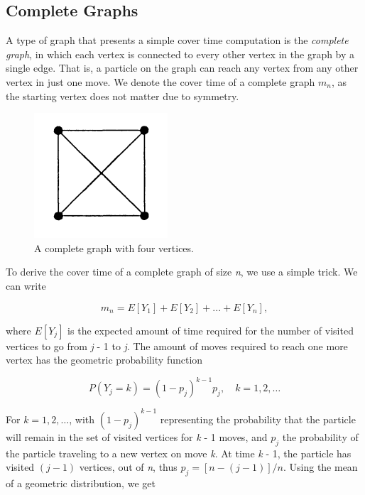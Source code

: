 \documentclass[11pt]{article}
\begin{document}
\subsection{Complete Graphs}

\indent \indent A type of graph that presents a simple cover time computation is the \textit{complete graph}, in which each vertex is connected to every other vertex in the graph by a single edge. That is, a particle on the graph can reach any vertex from any other vertex in just one move. We denote the cover time of a complete graph \textit{$m_{n}$}, as the starting vertex does not matter due to symmetry.

\begin{figure}[h]
\centering
\includegraphics[scale = 0.8]{CompleteFour}
\caption{A complete graph with four vertices.}
\label{fig:CompleteFour}
\end{figure}

To derive the cover time of a complete graph of size \textit{n}, we use a simple trick. We can write

\begin{equation}
m_{n} = E[Y_{1}] + E[Y_{2}] + ... + E[Y_{n}],
\end{equation}

where $E[Y_{j}]$ is the expected amount of time required for the number of visited vertices to go from \textit{j} - 1 to \textit{j}. The amount of moves required to reach one more vertex has the geometric probability function 

\begin{equation}
P(Y_{j} = k) = (1-p_{j})^{k-1}p_{j}, \quad k = 1, 2, \ldots
\end{equation}

For $k = 1, 2, \ldots$, with $(1-p_{j})^{k-1}$ representing the probability that the particle will remain in the set of visited vertices for \textit{k} - 1 moves, and $p_{j}$ the probability of the particle traveling to a new vertex on move \textit{k}.  At time \textit{k} - 1, the particle has visited $(j - 1)$ vertices, out of \textit{n}, thus $p_{j} =  [n - (j - 1)]/n$. Using the mean of a geometric distribution, we get
\end{document}

